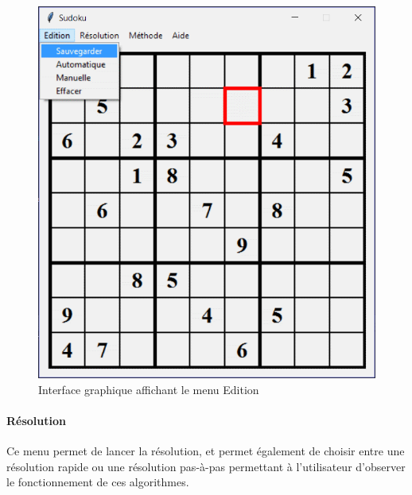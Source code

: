 \documentclass[12pt,a4paper]{report}
\begin{document}
\begin{figure}[!h]
 \center
 \includegraphics[scale=0.5]{../pictures/Sudoku_edition}
 \caption{Interface graphique affichant le menu Edition}
\end{figure}

\paragraph{Résolution}Ce menu permet de lancer la résolution, et permet également de choisir entre une résolution rapide ou une résolution pas-à-pas permettant à l'utilisateur d'observer le fonctionnement de ces algorithmes.
\end{document}
